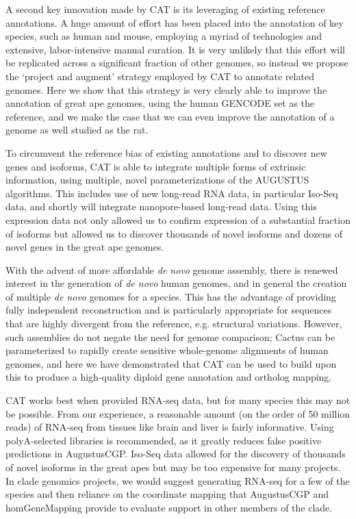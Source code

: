 \documentclass[fleqn,10pt]{wlscirep}
\begin{document}
A second key innovation made by CAT is its leveraging of existing reference annotations. A huge amount of effort has been placed into the annotation of key species, such as human and mouse, employing a myriad of technologies and extensive, labor-intensive manual curation. It is very unlikely that this effort will be replicated across a significant fraction of other genomes, so instead we propose the `project and augment' strategy employed by CAT to annotate related genomes. Here we show that this strategy is very clearly able to improve the annotation of great ape genomes, using the human GENCODE set as the reference, and we make the case that we can even improve the annotation of a genome as well studied as the rat. 

To circumvent the reference bias of existing annotations and to discover new genes and isoforms, CAT is able to integrate multiple forms of extrinsic information, using multiple, novel parameterizations of the AUGUSTUS algorithms. This includes use of new long-read RNA data, in particular Iso-Seq data, and shortly will integrate nanopore-based long-read data\cite{byrne2017nanopore}. Using this expression data not only allowed us to confirm expression of a substantial fraction of isoforms but allowed us to discover thousands of novel isoforms and dozens of novel genes in the great ape genomes.

With the advent of more affordable \textit{de novo} genome assembly, there is renewed interest in the generation of \textit{de novo} human genomes, and in general the creation of multiple \textit{de novo} genomes for a species. This has the advantage of providing fully independent reconstruction and is particularly appropriate for sequences that are highly divergent from the reference, e.g. structural variations. However, such assemblies do not negate the need for genome comparison; Cactus can be parameterized to rapidly create sensitive whole-genome alignments of human genomes, and here we have demonstrated that CAT can be used to build upon this to produce a high-quality diploid gene annotation and ortholog mapping. 

CAT works best when provided RNA-seq data, but for many species this may not be possible. From our experience, a reasonable amount (on the order of 50 million reads) of RNA-seq from tissues like brain and liver is fairly informative. Using polyA-selected libraries is recommended, as it greatly reduces false positive predictions in AugustusCGP. Iso-Seq data allowed for the discovery of thousands of novel isoforms in the great apes but may be too expensive for many projects. In clade genomics projects, we would suggest generating RNA-seq for a few of the species and then reliance on the coordinate mapping that AugustusCGP and homGeneMapping provide to evaluate support in other members of the clade. 
\end{document}
